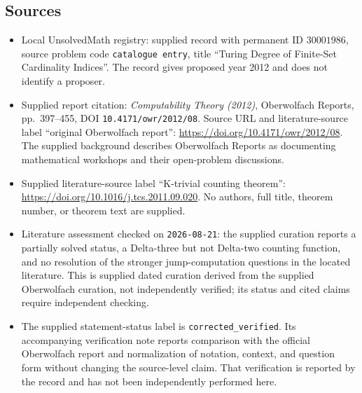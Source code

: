 \documentclass[11pt]{article}
\begin{document}
\subsection{Sources}
\begin{itemize}
\item Local UnsolvedMath registry: supplied record with permanent ID \(30001986\), source problem code \texttt{catalogue entry}, title ``Turing Degree of Finite-Set Cardinality Indices''. The record gives proposed year 2012 and does not identify a proposer.
\item Supplied report citation: \emph{Computability Theory (2012)}, Oberwolfach Reports, pp.\ 397--455, DOI \texttt{10.4171/owr/2012/08}. Source URL and literature-source label ``original Oberwolfach report'': \url{https://doi.org/10.4171/owr/2012/08}. The supplied background describes Oberwolfach Reports as documenting mathematical workshops and their open-problem discussions.
\item Supplied literature-source label ``K-trivial counting theorem'': \url{https://doi.org/10.1016/j.tcs.2011.09.020}. No authors, full title, theorem number, or theorem text are supplied.
\item Literature assessment checked on \texttt{2026-08-21}: the supplied curation reports a partially solved status, a Delta-three but not Delta-two counting function, and no resolution of the stronger jump-computation questions in the located literature. This is supplied dated curation derived from the supplied Oberwolfach curation, not independently verified; its status and cited claims require independent checking.
\item The supplied statement-status label is \texttt{corrected\_verified}. Its accompanying verification note reports comparison with the official Oberwolfach report and normalization of notation, context, and question form without changing the source-level claim. That verification is reported by the record and has not been independently performed here.
\end{itemize}
\end{document}
